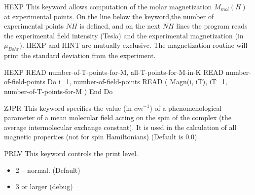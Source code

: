 \begin{keywordlist}
\item[HEXP]
This keyword allows computation of the molar magnetization $M_{mol} (H)$ at experimental points.
On the line below the keyword,the number of experimental points $NH$ is defined, and on the next $NH$ lines the program reads the experimental field intensity (Tesla) and the experimental magnetization (in $\mu_{Bohr}$). HEXP and HINT are mutually exclusive. The magnetization routine will print the standard deviation from the experiment.
\begin{sourcelisting}
HEXP
   READ  number-of-T-points-for-M,  all-T-points-for-M-in-K
   READ  number-of-field-points
   Do i=1, number-of-field-points
      READ ( Magn(i, iT), iT=1, number-of-T-points-for-M )
   End Do
\end{sourcelisting}





\item[ZJPR]
This keyword specifies the value (in $cm^{-1}$) of a phenomenological parameter of a mean molecular field acting on the spin of the complex (the average intermolecular exchange constant). It is used in the calculation of all magnetic properties (not for spin Hamiltonians) (Default is 0.0)




\item[PRLV]
This keyword controls the print level.
\begin{itemize}
 \item 2 -- normal. (Default)
 \item 3 or larger (debug)
\end{itemize}
\end{keywordlist}
